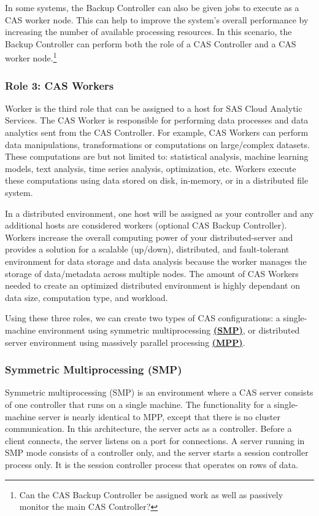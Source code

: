 In some systems, the Backup Controller can also be given jobs to execute as a CAS worker node. This can help to improve the system's overall performance by increasing the number of available processing resources. In this scenario, the Backup Controller can perform both the role of a CAS Controller and a CAS worker node.\footnote{Can the CAS Backup Controller be assigned work as well as passively monitor the main CAS Controller?}


\subsubsection{Role 3: CAS Workers}
Worker is the third role that can be assigned to a host for SAS Cloud Analytic Services. The CAS Worker is responsible for performing data processes and data analytics sent from the CAS Controller. For example, CAS Workers can perform data manipulations, transformations or computations on large/complex datasets. These computations are but not limited to: statistical analysis, machine learning models, text analysis, time series analysis, optimization, etc. Workers execute these computations using data stored on disk, in-memory, or in a distributed file system. 

In a distributed environment, one host will be assigned as your controller and any additional hosts are considered workers (optional CAS Backup Controller). Workers increase the overall computing power of your distributed-server and provides a solution for a scalable (up/down), distributed, and fault-tolerant environment for data storage and data analysis because the worker manages the storage of data/metadata across multiple nodes. The amount of CAS Workers needed to create an optimized distributed environment is highly dependant on data size, computation type, and workload.  

Using these three roles, we can create two types of CAS configurations: a single-machine environment using symmetric multiprocessing \href{https://documentation.sas.com/doc/en/calcdc/3.3/calserverscas/n05000viyaservers000000admin.htm}{\textbf{(SMP)}}, or distributed server environment using massively parallel processing \href{https://documentation.sas.com/doc/en/calcdc/3.3/calserverscas/n05000viyaservers000000admin.htm}{\textbf{{(MPP)}}}.

\subsubsection{Symmetric Multiprocessing (SMP)}
Symmetric multiprocessing (SMP) is an environment where a CAS server consists of one controller that runs on a single machine. The functionality for a single-machine server is nearly identical to MPP, except that there is no cluster communication. In this architecture, the server acts as a controller. Before a client connects, the server listens on a port for connections. A server running in SMP mode consists of a controller only, and the server starts a session controller process only. It is the session controller process that operates on rows of data.

